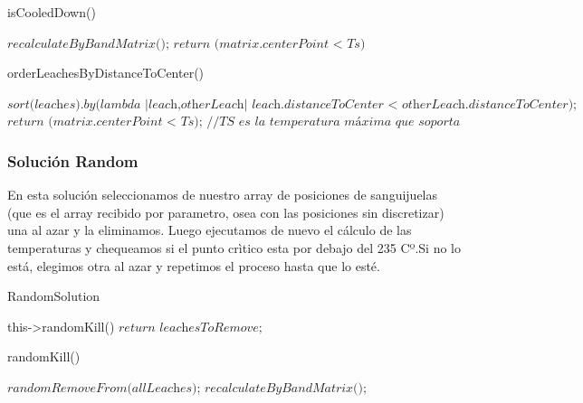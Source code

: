 \begin{algorithm}
\caption{isCooledDown()}\label{euclid}
\begin{algorithmic}[1]
\State $\textit{recalculateByBandMatrix();}$
\State $\textit{return (matrix.centerPoint < Ts)}$ 
\end{algorithmic}
\end{algorithm}

\begin{algorithm}
\caption{orderLeachesByDistanceToCenter()}\label{euclid}
\begin{algorithmic}[1]
\State $\textit{sort(leaches).by(lambda {|leach,otherLeach| leach.distanceToCenter < otherLeach.distanceToCenter});}$
\State $\textit{return (matrix.centerPoint < Ts); //TS es la temperatura máxima que soporta el centro}$
\end{algorithmic}
\end{algorithm}

\subsubsection{Solución Random}\label{sec:solucionRandom}
En esta solución seleccionamos de nuestro array de posiciones de sanguijuelas (que es el array recibido por parametro, osea con las posiciones sin discretizar) una al azar y la eliminamos. Luego ejecutamos de nuevo el cálculo de las temperaturas y chequeamos si el punto crìtico esta por debajo del 235 Cº.Si no lo está, elegimos otra al azar y repetimos el proceso hasta que lo esté. 

\begin{algorithm}
\caption{RandomSolution}\label{euclid}
\begin{algorithmic}[1]
\Do
    \State this->randomKill()
\State $\textit{return leachesToRemove;}$
\end{algorithmic}
\end{algorithm}

\begin{algorithm}
\caption{randomKill()}\label{euclid}
\begin{algorithmic}[1]
\State $\textit{randomRemoveFrom(allLeaches);}$ 
\State $\textit{recalculateByBandMatrix();}$
\end{algorithmic}
\end{algorithm}

